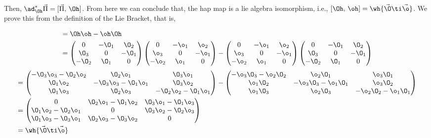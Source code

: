 \noindent
Then, $\ad^*_{\Oh}\vec\Pi = [\vec\Pi,\,\Oh]$. From here we can conclude that, the hap map is a lie algebra isomorphism, i.e., $ [\Oh,\,\oh] = \wh{\vec\O\ti\vec\o} $. We prove this from the definition of the Lie Bracket, that is,

\begin{align*}
  [\Oh, \oh] &= \Oh\oh - \oh\Oh\\
  &= \begin{pmatrix}
    0 & -\O_1 & \O_2 \\ \O_3 & 0 & -\O_1 \\ -\O_2 & \O_1 & 0
  \end{pmatrix}\begin{pmatrix}
    0 & -\o_1 & \o_2 \\ \o_3 & 0 & -\o_1 \\ -\o_2 & \o_1 & 0
  \end{pmatrix} - \begin{pmatrix}
    0 & -\o_1 & \o_2 \\ \o_3 & 0 & -\o_1 \\ -\o_2 & \o_1 & 0
  \end{pmatrix}\begin{pmatrix}
    0 & -\O_1 & \O_2 \\ \O_3 & 0 & -\O_1 \\ -\O_2 & \O_1 & 0
  \end{pmatrix}\\
\end{align*}
\begin{align*}
  &= \begin{pmatrix}
    -\O_3\o_3 - \O_2\o_2 & \O_2\o_1 & \O_3\o_1 \\
    \O_1\o_2 & -\O_3\o_3 - \O_1\o_1 & \O_3\o_2 \\
    \O_1\o_3 & \O_2\o_3 & -\O_2\o_2 - \O_1\o_1
\end{pmatrix} - \begin{pmatrix}
  -\o_3\O_3 - \o_2\O_2 & \o_2\O_1 & \o_3\O_1 \\
  \o_1\O_2 & -\o_3\O_3 - \o_1\O_1 & \o_3\O_2 \\
  \o_1\O_3 & \o_2\O_3 & -\o_2\O_2 - \o_1\O_1
\end{pmatrix} \\
&= \begin{pmatrix}
  0 & \O_2\o_1 - \O_1\o_2 & \O_3\o_1 - \O_1\o_3 \\
  \O_1\o_2 - \O_2\o_1 & 0 & \O_3\o_2 - \O_2\o_3 \\
  \O_1\o_3 - \O_3\o_1 & \O_2\o_3 - \O_3\o_2 & 0
\end{pmatrix} \\
&= \wh{\vec\O \ti \vec\o}
\end{align*}

